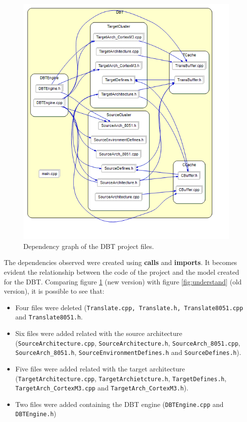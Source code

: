 \documentclass[12pt]{article}
\begin{document}
{\begin{figure}[!htb]
\centerline{
\includegraphics[scale=0.7]{images/DBT_understand}
}
\caption{Dependency graph of the DBT project files.}
\label{fig:refactorunderstand} 
\end{figure}

The dependencies observed were created using \textbf{calls} and \textbf{imports}. It becomes evident the relationship between the code of the project and the model created for the DBT. Comparing figure \ref{fig:refactorunderstand} (new version) with figure \ref{fig:understand} (old version), it is possible to see that:
\begin{itemize}
\item Four files were deleted (\texttt{Translate.cpp, Translate.h, Translate8051.cpp} and \texttt{Translate8051.h}.
\item Six files were added related with the source architecture (\texttt{SourceArchitecture.cpp}, \texttt{SourceArchitecture.h}, \texttt{SourceArch\_8051.cpp}, \texttt{SourceArch\_8051.h}, \texttt{SourceEnvironmentDefines.h} and \texttt{SourceDefines.h}).
\item Five files were added related with the target architecture (\texttt{TargetArchitecture.cpp}, \texttt{TargetArchietcture.h}, \texttt{TargetDefines.h}, \texttt{TargetArch\_CortexM3.cpp} and \texttt{TargetArch\_CortexM3.h}).
\item Two files were added containing the DBT engine (\texttt{DBTEngine.cpp} and \texttt{DBTEngine.h})
\end{itemize}

}
\end{document}

